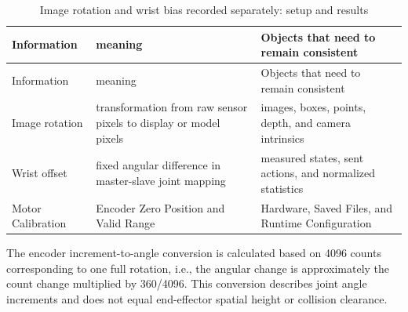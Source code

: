 \FloatBarrier\begingroup\small\setlength{\tabcolsep}{2.5pt}
\begin{longtable}[]{@{}
  >{\raggedright\arraybackslash}p{}
  >{\raggedright\arraybackslash}p{}
  >{\raggedright\arraybackslash}p{}@{}}
\caption{Image rotation and wrist bias recorded separately: setup and results}\label{tab:s01-2}\tabularnewline
\toprule\noalign{}
\begin{minipage}[b]{\linewidth}\raggedright
Information
\end{minipage} & \begin{minipage}[b]{\linewidth}\raggedright
meaning
\end{minipage} & \begin{minipage}[b]{\linewidth}\raggedright
Objects that need to remain consistent
\end{minipage} \\
\midrule\noalign{}
\endfirsthead
\toprule\noalign{}
\begin{minipage}[b]{\linewidth}\raggedright
Information
\end{minipage} & \begin{minipage}[b]{\linewidth}\raggedright
meaning
\end{minipage} & \begin{minipage}[b]{\linewidth}\raggedright
Objects that need to remain consistent
\end{minipage} \\
\midrule\noalign{}
\endhead
\bottomrule\noalign{}
\endlastfoot
Image rotation & transformation from raw sensor pixels to display or model pixels & images, boxes, points, depth, and camera intrinsics \\
Wrist offset & fixed angular difference in master-slave joint mapping & measured states, sent actions, and normalized statistics \\
Motor Calibration & Encoder Zero Position and Valid Range & Hardware, Saved Files, and Runtime Configuration \\
\end{longtable}\endgroup

The encoder increment-to-angle conversion is calculated based on 4096 counts corresponding to one full rotation, i.e., the angular change is approximately the count change multiplied by 360/4096. This conversion describes joint angle increments and does not equal end-effector spatial height or collision clearance.


